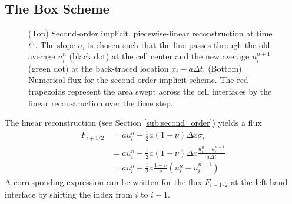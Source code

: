 \subsection{The Box Scheme}%
\label{sub:box_scheme}

\begin{figure}[htbp]
    \centering

    \begin{subfigure}[b]{\textwidth}
        \centering
        
    \end{subfigure}

    \vspace{1cm}

    \begin{subfigure}[b]{\textwidth}
        \centering
        
    \end{subfigure}

    \caption{(Top) Second-order implicit, piecewise-linear reconstruction at time \(t^n\).
        The slope \(\sigma_i\) is chosen such that the line passes through the old average \(u_{i}^{n}\) (black dot) at the cell center and the new average \(u_i^{n+1}\) (green dot) at the back-traced location \(x_i - a\Delta t\).
(Bottom) Numerical flux for the second-order implicit scheme.
The red trapezoids represent the area swept across the cell interfaces by the linear reconstruction over the time step.}
    \label{fig:box_reconstruct}
\end{figure}

The linear reconstruction (see Section \ref{sub:second_order}) yields a flux
\begin{equation}
    \begin{split}
        \label{eq:box-flux-explicit-start}
        F_{i+1/2} &= a u_i^n + \frac{1}{2} a (1 - \nu) \Delta x \sigma_i \\
                  &= a u_{i}^{n} + \frac{1}{2} a (1-\nu) \Delta x \frac{ u_{i}^{n}-u_{i}^{n+1} }{a\Delta t} \\
                  &= a u_{i}^{n} + \frac{1}{2} a \frac{1-\nu}{\nu}  \left( u_{i}^{n}-u_{i}^{n+1} \right)
    \end{split}
\end{equation}
A corresponding expression can be written for the flux \(F_{i-1/2}\) at the left-hand interface by shifting the index from \(i\) to \(i-1\).


